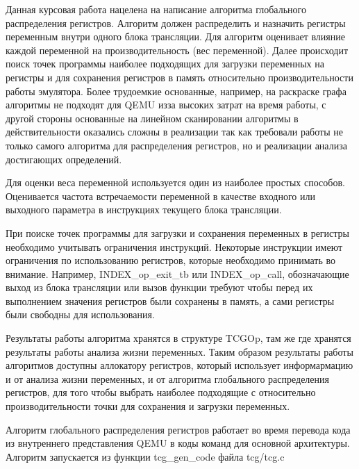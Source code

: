Данная курсовая работа нацелена на написание алгоритма глобального распределения регистров. Алгоритм должен распределить и назначить регистры переменным внутри одного блока трансляции. Для алгоритм оценивает влияние каждой переменной на производительность (вес переменной). Далее происходит поиск точек программы наиболее подходящих для загрузки переменных на регистры и для сохранения регистров в память относительно производительности работы эмулятора. Более трудоемкие основанные, например, на раскраске графа алгоритмы не подходят для QEMU из\-за высоких затрат на время работы, с другой стороны основанные на линейном сканировании алгоритмы в действительности оказались сложны в реализации так как требовали работы не только самого алгоритма для распределения регистров, но и реализации анализа достигающих определений.

Для оценки веса переменной используется один из наиболее простых способов. Оценивается частота встречаемости переменной в качестве входного или выходного параметра в инструкциях текущего блока трансляции.

При поиске точек программы для загрузки и сохранения переменных в регистры необходимо учитывать ограничения инструкций. Некоторые инструкции имеют ограничения по использованию регистров, которые необходимо принимать во внимание. Например, INDEX\_op\_exit\_tb или INDEX\_op\_call, обозначающие выход из блока трансляции или вызов функции требуют чтобы перед их выполнением значения регистров были сохранены в память, а сами регистры были свободны для использования.

Результаты работы алгоритма хранятся в структуре TCGOp, там же где хранятся результаты работы анализа жизни переменных. Таким образом результаты работы алгоритмов доступны аллокатору регистров, который использует информармацию и от анализа жизни переменных, и от алгоритма глобального распределения регистров, для того чтобы выбрать наиболее подходящие с относительно производительности точки для сохранения и загрузки переменных.

Алгоритм глобального распределения регистров работает во время перевода кода из внутреннего представления QEMU в коды команд для основной архитектуры. Алгоритм запускается из функции tcg\_gen\_code файла tcg/tcg.c

